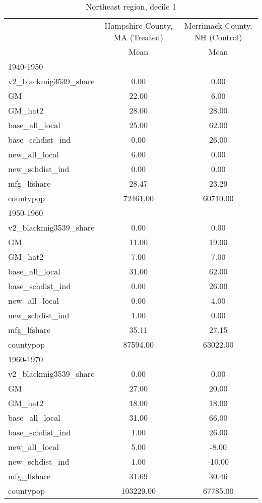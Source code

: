 \begin{table}[htbp]\centering
\def\sym#1{\ifmmode^{#1}\else\(^{#1}\)\fi}
\caption{Northeast region, decile 1 \label{tab1}}
\begin{tabular}{l*{2}{c}}
\toprule
                    &\multicolumn{1}{c}{Hampshire County, MA (Treated)}&\multicolumn{1}{c}{Merrimack County, NH (Control)}\\
                    &        Mean&        Mean\\
\midrule
1940-1950           &            &            \\
v2\_blackmig3539\_share&        0.00&        0.00\\
GM                  &       22.00&        6.00\\
GM\_hat2             &       28.00&       28.00\\
base\_all\_local      &       25.00&       62.00\\
base\_schdist\_ind    &        0.00&       26.00\\
new\_all\_local       &        6.00&        0.00\\
new\_schdist\_ind     &        0.00&        0.00\\
mfg\_lfshare         &       28.47&       23.29\\
countypop           &    72461.00&    60710.00\\
\midrule
1950-1960           &            &            \\
v2\_blackmig3539\_share&        0.00&        0.00\\
GM                  &       11.00&       19.00\\
GM\_hat2             &        7.00&        7.00\\
base\_all\_local      &       31.00&       62.00\\
base\_schdist\_ind    &        0.00&       26.00\\
new\_all\_local       &        0.00&        4.00\\
new\_schdist\_ind     &        1.00&        0.00\\
mfg\_lfshare         &       35.11&       27.15\\
countypop           &    87594.00&    63022.00\\
\midrule
1960-1970           &            &            \\
v2\_blackmig3539\_share&        0.00&        0.00\\
GM                  &       27.00&       20.00\\
GM\_hat2             &       18.00&       18.00\\
base\_all\_local      &       31.00&       66.00\\
base\_schdist\_ind    &        1.00&       26.00\\
new\_all\_local       &        5.00&       -8.00\\
new\_schdist\_ind     &        1.00&      -10.00\\
mfg\_lfshare         &       31.69&       30.46\\
countypop           &   103229.00&    67785.00\\
\bottomrule
\end{tabular}
\end{table}
